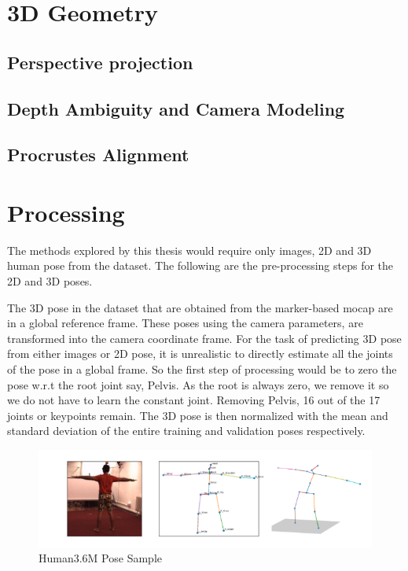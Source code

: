 \section{3D Geometry}
\lipsum[1-4] %
\subsection{Perspective projection}
\lipsum[1] %
\subsection{Depth Ambiguity and Camera Modeling}
\lipsum[1] %
\subsection{Procrustes Alignment}
\lipsum[1-4] %

\section{Processing}

The methods explored by this thesis would require only images, 2D and 3D human pose from the dataset. The following are the pre-processing steps for the 2D and 3D poses.

The 3D pose in the dataset that are obtained from the marker-based \ac{mocap} are in a global reference frame. These poses using the camera parameters, are transformed into the camera coordinate frame. For the task of predicting 3D pose from either images or 2D pose, it is unrealistic to directly estimate all the joints of the pose in a global frame. So the first step of processing would be to zero the pose w.r.t the root joint say, Pelvis. As the root is always zero, we remove it so we do not have to learn the constant joint. Removing Pelvis, 16 out of the 17 joints or keypoints remain. The 3D pose is then normalized with the mean and standard deviation of the entire training and validation poses respectively.

\begin{figure}[h]
    \centering
    \includegraphics[width=\textwidth]{figures/h36poses.png}
    \caption{Human3.6M Pose Sample}
    \label{fig:h36_poses}
\end{figure}

